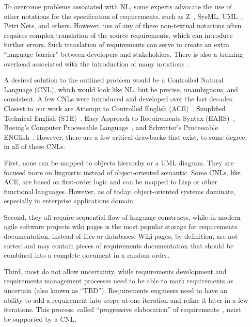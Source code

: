 \documentclass[sigplan,10pt,nonacm=true]{acmart}
\newcommand{\nospell}[1]{#1}
\begin{document}
To overcome problems associated with NL, some experts advocate the use of
other notations for the specification of requirements, such as
Z~\citep{woodcock96}, SysML, UML~\citep{uml}, Petri Nets, and others. However,
use of any of these non-textual notations often requires complex translation
of the source requirements, which can introduce further errors. Such
translation of requirements can serve to create an extra ``language
barrier'' between developers and stakeholders. There is also a training
overhead associated with the introduction of many notations~\citep{ears09}.

A desired solution to the outlined problem would be a Controlled Natural
Language (CNL), which would look like NL, but be precise,
unambiguous, and consistent. A few CNLs were introduced and developed over
the last decades. Closest to our work are Attempt to Controlled English
(ACE)~\citep{ace06}, Simplified Technical English (STE)~\citep{ste05}, Easy
Approach to Requirements Syntax (EARS)~\citep{ears09}, Boeing's Computer
Processable Language~\citep{clark05}, and \nospell{Schwitter's Processable
ENGlish}~\citep{peng}. However, there are a few critical drawbacks that exist,
to some degree, in all of these CNLs.

First, none can be mapped to objects hierarchy or a UML diagram.
They are focused more on linguistic instead of object-oriented semantic.
Some CNLs, like ACE, are based on first-order logic and can be mapped to
Lisp or other functional languages. However, as of today, object-oriented
systems dominate, especially in enterprise applications domain.

Second, they all require sequential flow of language constructs, while in
modern agile software projects wiki pages is the most popular storage for
requirements documentation, instead of files or databases. Wiki pages, by
definition, are not sorted and may contain pieces of requirements
documentation that should be combined into a complete document in a random
order.

Third, most do not allow uncertainty, while requirements development
and requirements management processes need to be able to mark
requirements as uncertain (also known as ``TBD''). Requirements engineers
need to have an ability to add a requirement into scope at one iteration
and refine it later in a few iterations. This process, called ``progressive
elaboration'' of requirements~\citep{pmbok4}, must be supported by a CNL.
\end{document}
